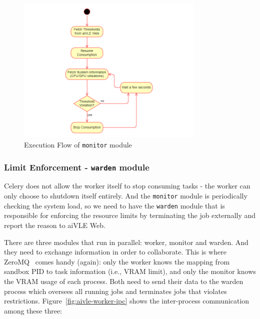 \begin{figure}[H]
    \centering
    \includegraphics[width=0.8\textwidth]{images/aivle-worker-monitor-flow.png}
    \caption{Execution Flow of \texttt{monitor} module}
    \label{fig:aivle-worker-monitor-flow}
\end{figure}

\subsubsection{Limit Enforcement - \texttt{warden} module}
\label{sss:warden}
Celery does not allow the worker itself to stop consuming tasks - the worker can only choose to shutdown itself entirely. And the \texttt{monitor} module is periodically checking the system load, so we need to have the \texttt{warden} module that is responsible for enforcing the resource limits by terminating the job externally and report the reason to aiVLE Web.

There are three modules that run in parallel: worker, monitor and warden. And they need to exchange information in order to collaborate. This is where ZeroMQ~\cite{zeromq} comes handy (again): only the worker knows the mapping from sandbox PID to task information (i.e., VRAM limit), and only the monitor knows the VRAM usage of each process. Both need to send their data to the warden process which oversees all running jobs and terminates jobs that violates restrictions. Figure~\ref{fig:aivle-worker-ipc} shows the inter-process communication among these three:

